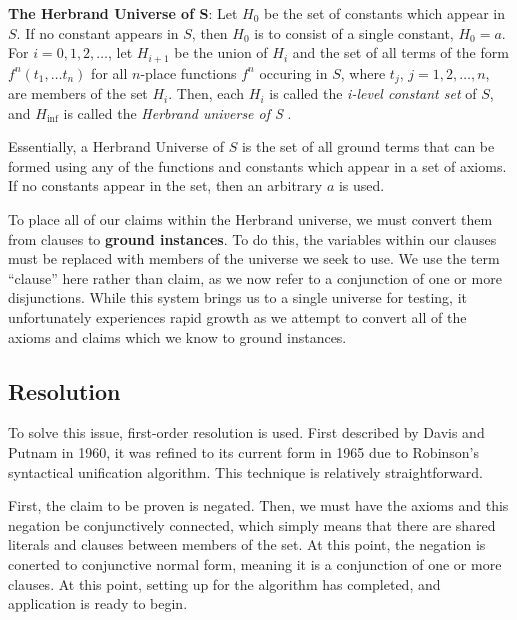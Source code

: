 \begin{definition}

	\textbf{The Herbrand Universe of S}: Let $H_0$ be the set of constants which appear in $S$. If no constant appears in $S$, then $H_0$ is to consist of a single constant, $H_0 = {a}$. For $i = 0, 1, 2, \ldots $, let $H_{i+1}$ be the union of $H_i$ and the set of all terms of the form $f^n(t_1, \ldots t_n)$ for all $n$-place functions $f^n$ occuring in $S$, where $t_j$, $j=1, 2, \ldots , n$, are members of the set $H_i$. Then, each $H_i$ is called the \textit{i-level constant set} of $S$, and $H_{\inf} $ is called the \textit{Herbrand universe of S} \cite{changLee}.


\end{definition}

Essentially, a Herbrand Universe of $S$ is the set of all ground terms that can be formed using any of the functions and constants which appear in a set of axioms. If no constants appear in the set, then an arbitrary $a$ is used.

To place all of our claims within the Herbrand universe, we must convert them from clauses to \textbf{ground instances}. To do this, the variables within our clauses must be replaced with members of the universe we seek to use. We use the term ``clause'' here rather than claim, as we now refer to a conjunction of one or more disjunctions. While this system brings us to a single universe for testing, it unfortunately experiences rapid growth as we attempt to convert all of the axioms and claims which we know to ground instances.

\subsection{Resolution} 

To solve this issue, first-order resolution is used. First described by Davis and Putnam in 1960, it was refined to its current form in 1965 due to Robinson's syntactical unification algorithm. This technique is relatively straightforward.

First, the claim to be proven is negated. Then, we must have the axioms and this negation be conjunctively connected, which simply means that there are shared literals and clauses between members of the set. At this point, the negation is conerted to conjunctive normal form, meaning it is a conjunction of one or more clauses. At this point, setting up for the algorithm has completed, and application is ready to begin.

